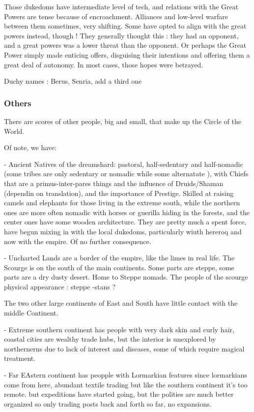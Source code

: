 Those dukedoms have intermediate level of tech, and relations with the Great Powers are tense because of encroachment. Alliances and low-level warfare between them sometimes, very shifting. Some have opted to align with the great powers instead, though ! They generally thought this : they had an opponent, and a great powers was a lower threat than the opponent. Or perhaps the Great Power simply made enticing offers, disguising their intentions and offering them a great deal of autonomy. In most cases, those hopes were betrayed.
	
Duchy names : Berus, Senria, add a third one

\subsubsection{Others}

There are scores of other people, big and small, that make up the Circle of the World.

Of note, we have:

- Ancient Natives of the dreamshard: pastoral, half-sedentary and half-nomadic (some tribes are only sedentary or nomadic while some alternatate ), with Chiefs that are a primus-inter-pares things and the influence of Druids/Shaman (dependin on translation), and the importance of Prestige. Skilled at raising camels and elephants for those living in the extreme south, while the northern ones are more often nomadic with horses or guerilla hiding in the forests, and the center ones have some wooden architecture. They are pretty much a spent force, have begun mixing in with the local dukedoms, particularly wiuth hereroq and now with the empire. Of no further consequence.

- Uncharted Lands are a border of the empire, like the limes in real life.
The Scourge is on the south of the main continents. Some parts are steppe, some parts are a dry dusty desert. Home to Steppe nomads. The people of the scourge physical appearance : steppe -stans ?


The two other large continents of East and South have little contact with the middle Continent.

- Extreme southern continent has people with very dark skin and curly hair, coastal cities are wealthy trade hubs, but the interior is unexplored by northernerns due to lack of interest and diseases, some of which require magical treatment.

- Far EAstern continent has peopple with Lormarkian features since lormarkians come from here, abundant textile trading but like the southern continent it's too remote. but expeditions have started going, but the polities are much better organized so only trading posts back and forth so far, no expansions.






